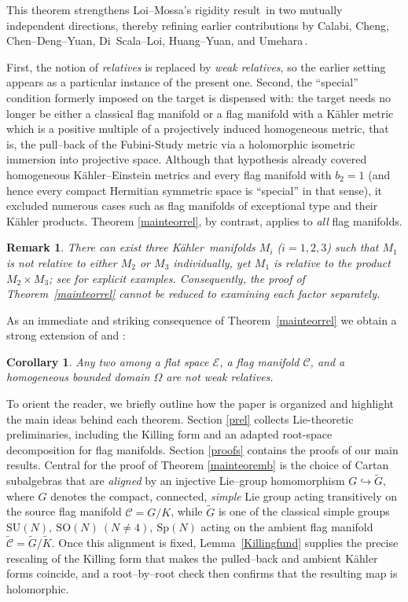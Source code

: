 \documentclass[reqno]{amsart}
\newcommand{\K}{K\"{a}hler}
\newtheorem{cor}{Corollary}
\newtheorem{remark}{Remark}
\begin{document}
This theorem strengthens Loi--Mossa's rigidity result\,\cite[Theorem 1.1]{LMrighom} in two mutually independent directions, thereby refining  earlier contributions by Calabi, Cheng, Chen--Deng--Yuan, Di~Scala--Loi, Huang--Yuan, and Umehara\,\cite{Cal,Cheng2021,CDY,diloi,HY,HYbook,UmearaC}.

First, the notion of \emph{relatives} is replaced by  \emph{weak relatives}, so the earlier setting appears as a particular instance of the present one.  Second, the ``special'' condition formerly imposed on the target is dispensed with: the target needs no longer be either a classical flag manifold or a flag manifold  with a  K\"ahler metric which is  a positive  multiple of a projectively induced homogeneous metric, that is, the pull--back of the Fubini-Study metric via a holomorphic isometric immersion into projective space.  Although that hypothesis already covered homogeneous K\"ahler--Einstein metrics
and  every flag manifold with $b_2=1$ (and hence every compact Hermitian symmetric space  is ``special'' in that sense), it excluded numerous cases such as flag manifolds of exceptional type and their K\"ahler products.  
Theorem \ref{mainteorrel}, by contrast, applies to \emph{all} flag manifolds.


\begin{remark}\rm
There can exist three \K\ manifolds $M_i$ ($i=1,2,3$) such that $M_1$ is not relative to either $M_2$ or $M_3$ individually, yet $M_1$ is relative to the product $M_2\times M_3$; see \cite{LMrighom} for explicit examples.
Consequently, the proof of Theorem~\ref{mainteorrel} cannot be reduced to examining each factor separately. 
\end{remark}


As an immediate and striking consequence of Theorem~\ref{mainteorrel} we obtain a strong extension of \cite[(ii) of Theorem~1.1]{PRIMO} and \cite[Corollary~2]{LMrighom}:
\begin{cor}\label{maincorol2}
Any two among a flat space $\mathcal E$, a flag manifold $\mathcal C$, and a homogeneous bounded domain $\Omega$ are not weak relatives.
\end{cor}


\vskip 0.3cm 
To orient the reader, we briefly outline how the paper is organized and highlight the main ideas behind each theorem.
Section \ref{prel} collects Lie-theoretic preliminaries, including the Killing form and an adapted root-space decomposition for flag manifolds. Section \ref{proofs} contains the proofs of our main results.
Central for the proof of Theorem \ref{mainteoremb}  is the choice of Cartan subalgebras that are \emph{aligned} by an injective Lie--group homomorphism $G \hookrightarrow \tilde G,$
where \(G\) denotes the compact, connected, \emph{simple} Lie group acting transitively on the source flag manifold \(\mathcal C = G/K\), while \(\tilde G\) is one of the classical simple groups \(\mathrm{SU}(N),\ \mathrm{SO}(N)\  (N\neq 4),\ \mathrm{Sp}(N)\) acting on the ambient flag manifold \(\tilde{\mathcal C} = \tilde G/\tilde K\).
Once this alignment is fixed, Lemma~\ref{Killingfund} supplies the precise rescaling of the Killing form that makes the pulled--back and ambient K\"ahler forms coincide, and a root--by--root check then confirms that the resulting map is holomorphic. 
\end{document}
